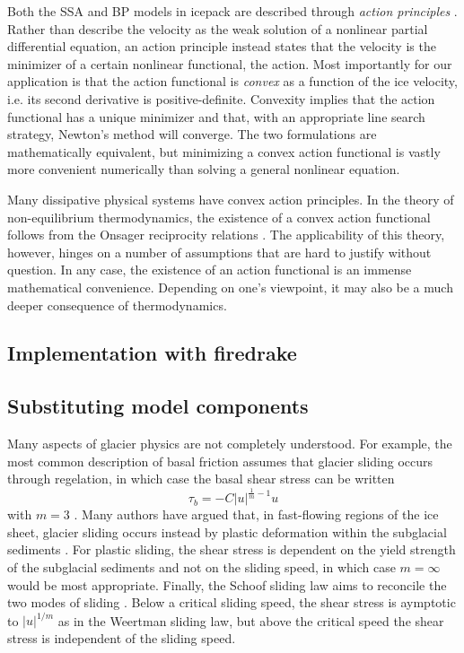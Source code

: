 \documentclass{article}
\theoremstyle{definition}
\theoremstyle{plain}
\begin{document}
Both the SSA and BP models in icepack are described through \emph{action principles} \citep{dukowicz2010consistent}.
Rather than describe the velocity as the weak solution of a nonlinear partial differential equation, an action principle instead states that the velocity is the minimizer of a certain nonlinear functional, the action.
Most importantly for our application is that the action functional is \emph{convex} as a function of the ice velocity, i.e. its second derivative is positive-definite.
Convexity implies that the action functional has a unique minimizer and that, with an appropriate line search strategy, Newton's method will converge.
The two formulations are mathematically equivalent, but minimizing a convex action functional is vastly more convenient numerically than solving a general nonlinear equation.

Many dissipative physical systems have convex action principles.
In the theory of non-equilibrium thermodynamics, the existence of a convex action functional follows from the Onsager reciprocity relations \citep{de2013non}.
The applicability of this theory, however, hinges on a number of assumptions that are hard to justify without question.
In any case, the existence of an action functional is an immense mathematical convenience.
Depending on one's viewpoint, it may also be a much deeper consequence of thermodynamics.

\subsection{Implementation with firedrake}

\subsection{Substituting model components}

Many aspects of glacier physics are not completely understood.
For example, the most common description of basal friction assumes that glacier sliding occurs through regelation, in which case the basal shear stress can be written
\begin{equation}
    \tau_b = -C|u|^{\frac{1}{m} - 1}u
\end{equation}
with $m = 3$ \citep{weertman1957sliding}.
Many authors have argued that, in fast-flowing regions of the ice sheet, glacier sliding occurs instead by plastic deformation within the subglacial sediments \citep{tulaczyk2000basal}.
For plastic sliding, the shear stress is dependent on the yield strength of the subglacial sediments and not on the sliding speed, in which case $m = \infty$ would be most appropriate.
Finally, the Schoof sliding law aims to reconcile the two modes of sliding \citep{schoof2005effect}.
Below a critical sliding speed, the shear stress is aymptotic to $|u|^{1/m}$ as in the Weertman sliding law, but above the critical speed the shear stress is independent of the sliding speed.
\end{document}
